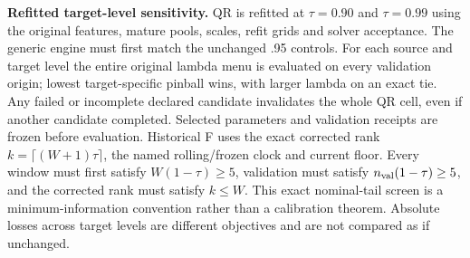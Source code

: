 \documentclass[11pt,a4paper]{article}
\begin{document}
\endgroup
\textbf{Refitted target-level sensitivity.} QR is refitted at \(\tau=0.90\) and \(\tau=0.99\) using the original features, mature pools, scales, refit grids and solver acceptance. The generic engine must first match the unchanged .95 controls. For each source and target level the entire original lambda menu is evaluated on every validation origin; lowest target-specific pinball wins, with larger lambda on an exact tie. Any failed or incomplete declared candidate invalidates the whole QR cell, even if another candidate completed. Selected parameters and validation receipts are frozen before evaluation. Historical F uses the exact corrected rank \(k=\lceil(W+1)\tau\rceil\), the named rolling/frozen clock and current floor. Every window must first satisfy \(W(1-\tau)\ge5\), validation must satisfy \(n_{\rm val}(1-\tau)\ge5\), and the corrected rank must satisfy \(k\le W\). This exact nominal-tail screen is a minimum-information convention rather than a calibration theorem. Absolute losses across target levels are different objectives and are not compared as if unchanged.
\end{document}
